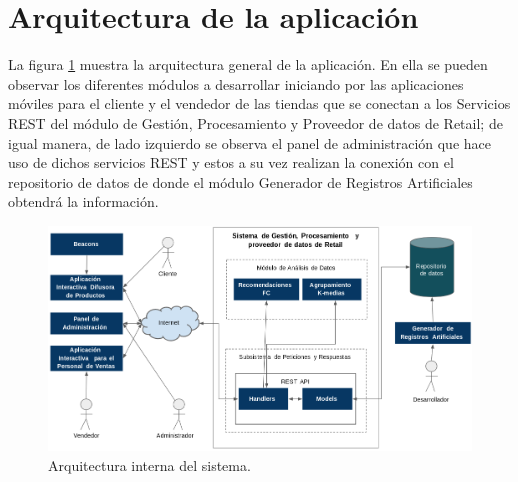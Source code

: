 \section{Arquitectura de la aplicación}
La figura \ref{image:arquitectura} muestra la arquitectura general de la aplicación. En ella se pueden observar los diferentes módulos a desarrollar iniciando por las aplicaciones móviles para el cliente y el vendedor de las tiendas que se conectan a los Servicios REST del módulo de Gestión, Procesamiento y Proveedor de datos de Retail; de igual manera, de lado izquierdo se observa el panel de administración que hace uso de dichos servicios REST y estos a su vez realizan la conexión con el repositorio de datos de donde el módulo Generador de Registros Artificiales obtendrá la información.
\FloatBarrier
\begin{figure}[htbp!]
		\centering
			\includegraphics[width=.9 \textwidth]{imagenes/Arquitecturas/general}
		\caption{Arquitectura interna del sistema.}
		\label{image:arquitectura}
\end{figure}
\FloatBarrier

